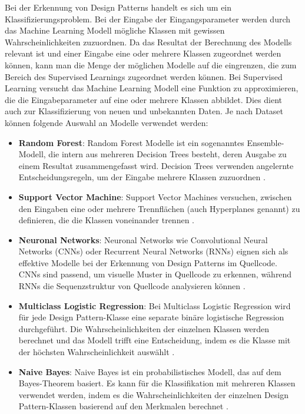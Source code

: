 \documentclass[conference]{IEEEtran}
\begin{document}
Bei der Erkennung von Design Patterns handelt es sich um ein Klassifizierungsproblem. Bei der Eingabe der Eingangsparameter werden durch das Machine Learning Modell mögliche Klassen mit gewissen Wahrscheinlichkeiten zuzuordnen.
Da das Resultat der Berechnung des Modells relevant ist und einer Eingabe eine oder mehrere Klassen zugeordnet werden können, kann man die Menge der möglichen Modelle auf die eingrenzen, die zum Bereich des Supervised Learnings zugeordnet werden können.
Bei Supervised Learning versucht das Machine Learning Modell eine Funktion zu approximieren, die die Eingabeparameter auf eine oder mehrere Klassen abbildet. Dies dient auch zur Klassifizierung von neuen und unbekannten Daten.
Je nach Dataset können folgende Auswahl an Modelle verwendet werden:

\begin{itemize}
    \item \textbf{Random Forest}: Random Forest Modelle ist ein sogenanntes Ensemble-Modell, die intern aus mehreren Decision Trees besteht, deren Ausgabe zu einem Resultat zusammengefasst wird. Decision Trees verwenden angelernte Entscheidungsregeln, um der Eingabe mehrere Klassen zuzuordnen \cite{scikit_random_forest}.
    \item \textbf{Support Vector Machine}: Support Vector Machines versuchen, zwischen den Eingaben eine oder mehrere Trennflächen (auch Hyperplanes genannt) zu definieren, die die Klassen voneinander trennen \cite{scikit_svm}.
    \item \textbf{Neuronal Networks}: Neuronal Networks wie Convolutional Neural Networks (CNNs) oder Recurrent Neural Networks (RNNs) eignen sich als effektive Modelle bei der Erkennung von Design Patterns im Quellcode. CNNs sind passend, um visuelle Muster in Quellcode zu erkennen, während RNNs die Sequenzstruktur von Quellcode analysieren können \cite{scikit_nn}.
    \item \textbf{Multiclass Logistic Regression}: Bei Multiclass Logistic Regression wird für jede Design Pattern-Klasse eine separate binäre logistische Regression durchgeführt. Die Wahrscheinlichkeiten der einzelnen Klassen werden berechnet und das Modell trifft eine Entscheidung, indem es die Klasse mit der höchsten Wahrscheinlichkeit auswählt \cite{scikit_lm}.
    \item \textbf{Naive Bayes}: Naive Bayes ist ein probabilistisches Modell, das auf dem Bayes-Theorem basiert. Es kann für die Klassifikation mit mehreren Klassen verwendet werden, indem es die Wahrscheinlichkeiten der einzelnen Design Pattern-Klassen basierend auf den Merkmalen berechnet \cite{scikit_bayes}.
\end{itemize}
\end{document}
